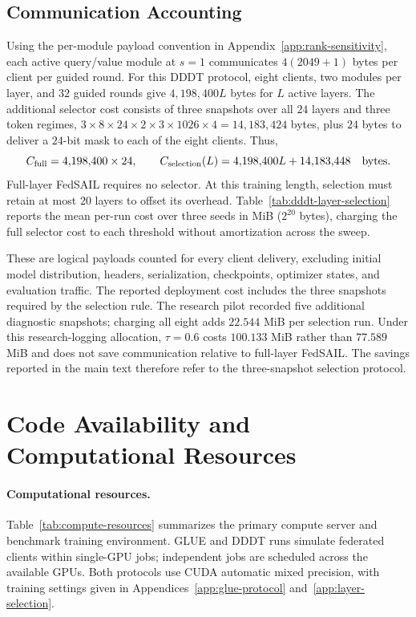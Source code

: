 \documentclass[11pt,letterpaper]{article}
\begin{document}
\subsection{Communication Accounting}

Using the per-module payload convention in
Appendix~\ref{app:rank-sensitivity}, each active query/value module at
$s=1$ communicates $4(2049+1)$ bytes per client per guided round.
For this DDDT protocol, eight clients, two modules per layer, and $32$
guided rounds give $4{,}198{,}400L$ bytes for $L$ active layers.
The additional selector cost consists of three snapshots over all
$24$ layers and three token regimes,
$3\times8\times24\times2\times3\times1026\times4=14{,}183{,}424$ bytes,
plus $24$ bytes to deliver a $24$-bit mask to each of the eight clients.
Thus,
\begin{equation}
    C_{\rm full}=4{,}198{,}400\times24,\qquad
    C_{\rm selection}(L)=4{,}198{,}400L+14{,}183{,}448
    \quad\text{bytes}.
    \label{eq:dddt-communication}
\end{equation}
Full-layer FedSAIL requires no selector. At this training length,
selection must retain at most $20$ layers to offset its overhead.
Table~\ref{tab:dddt-layer-selection} reports the mean per-run cost over
three seeds in MiB ($2^{20}$ bytes), charging the full selector cost to
each threshold without amortization across the sweep.

These are logical payloads counted for every client delivery, excluding
initial model distribution, headers, serialization, checkpoints,
optimizer states, and evaluation traffic. The reported deployment cost
includes the three snapshots required by the selection rule. The research
pilot recorded five additional diagnostic snapshots; charging all eight
adds $22.544$ MiB per selection run. Under this research-logging allocation,
$\tau=0.6$ costs $100.133$ MiB rather than $77.589$ MiB and does not save
communication relative to full-layer FedSAIL. The savings reported in
the main text therefore refer to the three-snapshot selection protocol.

\FloatBarrier

\section{Code Availability and Computational Resources}
\label{app:code-resources}
\paragraph{Computational resources.}
Table~\ref{tab:compute-resources} summarizes the primary compute server and
benchmark training environment. GLUE and DDDT runs simulate
federated clients within single-GPU jobs; independent jobs are scheduled
across the available GPUs. Both protocols use CUDA automatic mixed
precision, with training settings given in
Appendices~\ref{app:glue-protocol} and~\ref{app:layer-selection}.
\end{document}
